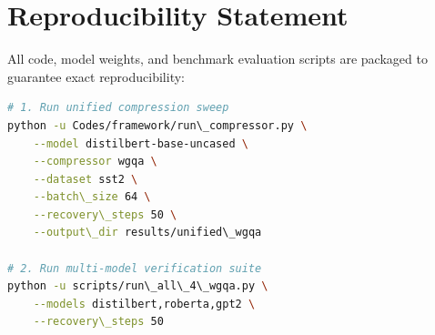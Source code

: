 \section{Reproducibility Statement}
All code, model weights, and benchmark evaluation scripts are packaged to guarantee exact reproducibility:
\begin{lstlisting}[language=bash]
# 1. Run unified compression sweep
python -u Codes/framework/run\_compressor.py \
    --model distilbert-base-uncased \
    --compressor wgqa \
    --dataset sst2 \
    --batch\_size 64 \
    --recovery\_steps 50 \
    --output\_dir results/unified\_wgqa

# 2. Run multi-model verification suite
python -u scripts/run\_all\_4\_wgqa.py \
    --models distilbert,roberta,gpt2 \
    --recovery\_steps 50
\end{lstlisting}
